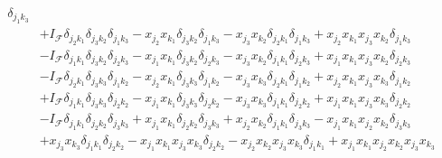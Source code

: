 \documentclass[aps,preprint]{revtex4}%
\begin{document}
\begin{align}
{}\delta_{j_{1}k_{3}}\nonumber\\
&  +I_{\mathcal{F}}\delta_{j_{2}k_{1}}\delta_{j_{3}k_{2}}\delta_{j_{1}k_{3}%
}-x_{j_{2}}x_{k_{1}}\delta_{j_{3}k_{2}}\delta_{j_{1}k_{3}}-x_{j_{3}}x_{k_{2}%
}\delta_{j_{2}k_{1}}\delta_{j_{1}k_{3}}+x_{j_{2}}x_{k_{1}}x_{j_{3}}x_{k_{2}%
}\delta_{j_{1}k_{3}}\nonumber\\
&  -I_{\mathcal{F}}\delta_{j_{1}k_{1}}\delta_{j_{3}k_{2}}\delta_{j_{2}k_{3}%
}-x_{j_{1}}x_{k_{1}}\delta_{j_{3}k_{2}}\delta_{j_{2}k_{3}}-x_{j_{3}}x_{k_{2}%
}\delta_{j_{1}k_{1}}\delta_{j_{2}k_{3}}+x_{j_{1}}x_{k_{1}}x_{j_{3}}x_{k_{2}%
}\delta_{j_{2}k_{3}}\nonumber\\
&  -I_{\mathcal{F}}\delta_{j_{2}k_{1}}\delta_{j_{3}k_{3}}\delta_{j_{1}k_{2}%
}-x_{j_{2}}x_{k_{1}}\delta_{j_{3}k_{3}}\delta_{j_{1}k_{2}}-x_{j_{3}}x_{k_{3}%
}\delta_{j_{2}k_{1}}\delta_{j_{1}k_{2}}+x_{j_{2}}x_{k_{1}}x_{j_{3}}x_{k_{3}%
}\delta_{j_{1}k_{2}}\nonumber\\
&  +I_{\mathcal{F}}\delta_{j_{1}k_{1}}\delta_{j_{3}k_{3}}\delta_{j_{2}k_{2}%
}-x_{j_{1}}x_{k_{1}}\delta_{j_{3}k_{3}}\delta_{j_{2}k_{2}}-x_{j_{3}}x_{k_{3}%
}\delta_{j_{1}k_{1}}\delta_{j_{2}k_{2}}+x_{j_{1}}x_{k_{1}}x_{j_{3}}x_{k_{3}%
}\delta_{j_{2}k_{2}}\nonumber\\
&  -I_{\mathcal{F}}\delta_{j_{1}k_{1}}\delta_{j_{2}k_{2}}\delta_{j_{3}k_{3}%
}+x_{j_{1}}x_{k_{1}}\delta_{j_{2}k_{2}}\delta_{j_{3}k_{3}}+x_{j_{2}}x_{k_{2}%
}\delta_{j_{1}k_{1}}\delta_{j_{3}k_{3}}-x_{j_{1}}x_{k_{1}}x_{j_{2}}x_{k_{2}%
}\delta_{j_{3}k_{3}}\nonumber\\
&  +x_{j_{3}}x_{k_{3}}\delta_{j_{1}k_{1}}\delta_{j_{2}k_{2}}-x_{j_{1}}%
x_{k_{1}}x_{j_{3}}x_{k_{3}}\delta_{j_{2}k_{2}}-x_{j_{2}}x_{k_{2}}x_{j_{3}%
}x_{k_{3}}\delta_{j_{1}k_{1}}+x_{j_{1}}x_{k_{1}}x_{j_{2}}x_{k_{2}}x_{j_{3}%
}x_{k_{3}}%
\end{align}
\end{document}

